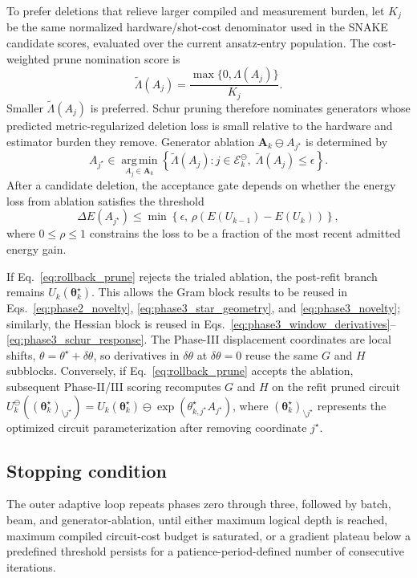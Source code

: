 \documentclass[
  reprint,
  amsmath,
  amssymb,
  aps,
  pra,
  nofootinbib,
  superscriptaddress,
  floatfix
]{revtex4-2}
\begin{document}
To prefer deletions that relieve larger compiled and measurement burden, let
\(K_j\) be the same normalized hardware/shot-cost denominator used in the SNAKE
candidate scores, evaluated over the current ansatz-entry population.  The
cost-weighted prune nomination score is
\[
\widetilde\Lambda(A_j)
=
\frac{\max\{0,\Lambda(A_j)\}}{K_j}.
\]
Smaller \(\widetilde\Lambda(A_j)\) is preferred.  Schur pruning therefore
nominates generators whose predicted metric-regularized deletion loss is small
relative to the hardware and estimator burden they remove.  Generator ablation
\(\mathbf A_k\ominus A_{j^\star}\) is determined by
\begin{equation}
A_{j^\star}
\in
\operatorname*{arg\,min}_{A_j\in\mathbf A_k}
\left\{
\widetilde\Lambda(A_j)
:
j\in\mathcal E_k^\ominus,\;
\widetilde\Lambda(A_j)\le\epsilon
\right\}.
\label{eq:ablation_nomination}
\end{equation}
After a candidate deletion, the acceptance gate depends on whether the energy
loss from ablation satisfies the threshold
\begin{equation}
\Delta E(A_{j^\star})
\le
\min\left\{
\epsilon,\,
\rho\left(E(U_{k-1})-E(U_k)\right)
\right\},
\label{eq:rollback_prune}
\end{equation}
where \(0\le\rho\le1\) constrains the loss to be a fraction of the most recent
admitted energy gain.

If Eq.~\eqref{eq:rollback_prune} rejects the trialed ablation, the post-refit
branch remains \(U_k(\boldsymbol\theta_k^\star)\).  This allows the Gram block results to be
reused in Eqs.~\eqref{eq:phase2_novelty}, \eqref{eq:phase3_star_geometry}, and
\eqref{eq:phase3_novelty}; similarly, the Hessian block is reused in
Eqs.~\eqref{eq:phase3_window_derivatives}--\eqref{eq:phase3_schur_response}.
The Phase-III displacement coordinates are local
shifts, \(\theta=\theta^\star+\delta\theta\), so derivatives in
\(\delta\theta\) at \(\delta\theta=0\) reuse the same \(G\) and \(H\)
subblocks.  Conversely, if Eq.~\eqref{eq:rollback_prune} accepts the ablation, subsequent Phase-II/III
scoring recomputes \(G\) and \(H\) on the refit pruned circuit
\(U_k^{\ominus}((\boldsymbol\theta_k^\star)_{\setminus j^\star})
=
U_k(\boldsymbol\theta_k^\star)\ominus
\exp(\theta_{k,j^\star}^\star A_{j^\star})\), where \((\boldsymbol\theta_k^\star)_{\setminus j^\star}\) represents the optimized circuit parameterization after removing coordinate \(j^\star\).



\subsection{Stopping condition}
The outer adaptive loop repeats phases zero through three, followed by batch, beam, and generator-ablation, until either maximum logical depth is reached, maximum compiled circuit-cost budget is saturated, or a gradient plateau below a predefined threshold persists for a patience-period-defined number of consecutive iterations.
\end{document}
